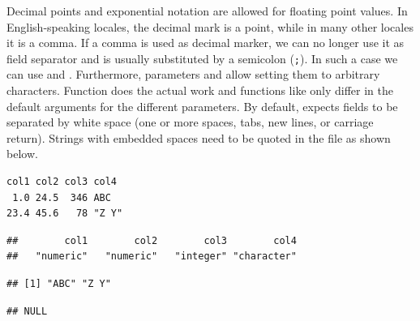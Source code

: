 \documentclass[krantz2]{krantz}\usepackage{knitr}
\begin{document}
Decimal points and exponential notation are allowed for floating point values. In English-speaking locales, the decimal mark is a point, while in many other locales it is a comma. If a comma is used as decimal marker, we can no longer use it as field separator and is usually substituted by a semicolon (\verb|;|). In such a case we can use  and . Furthermore, parameters  and  allow setting them to arbitrary characters. Function  does the actual work and functions like  only differ in the default arguments for the different parameters. By default,  expects fields to be separated by white space (one or more spaces, tabs, new lines, or carriage return). Strings with embedded spaces need to be quoted in the file as shown below.

\begin{knitrout}\footnotesize
{}\color{fgcolor}\begin{kframe}
\begin{verbatim}
col1 col2 col3 col4
 1.0 24.5  346 ABC
23.4 45.6   78 "Z Y"
\end{verbatim}
\end{kframe}
\end{knitrout}

\begin{knitrout}\footnotesize
{}\color{fgcolor}\begin{kframe}
\begin{alltt}
 \hlkwb{<-} \hlstd{(}\hlstd{,}  \hlstd{=} \hlstd{)}
\end{alltt}
\end{kframe}
\end{knitrout}

\begin{knitrout}\footnotesize
{}\color{fgcolor}\begin{kframe}
\begin{alltt}
\end{alltt}
\begin{verbatim}
##        col1        col2        col3        col4
##   "numeric"   "numeric"   "integer" "character"
\end{verbatim}
\begin{alltt}
\hlstd{from_txt_b.df[[}\hlstd{]]}
\end{alltt}
\begin{verbatim}
## [1] "ABC" "Z Y"
\end{verbatim}
\begin{alltt}
\hlstd{(from_txt_b.df[[}\hlstd{]])}
\end{alltt}
\begin{verbatim}
## NULL
\end{verbatim}
\end{kframe}
\end{knitrout}
\end{document}
